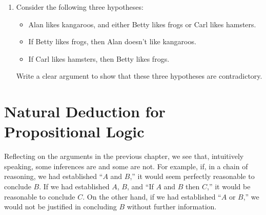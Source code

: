 \documentclass[letterpaper,10pt,english]{sphinxmanual}
\begin{document}
\begin{enumerate}
\sphinxAtStartPar
With these conventions, the first clue can be represented as
\begin{equation*}
\begin{split}((FA \vee SA) \to (MW \vee DW)) \wedge ((MA \vee DA) \to (FW \vee SW)),\end{split}
\end{equation*}
\sphinxAtStartPar
in other words, if the father or son was the accessory, then the mother or daughter was the witness, and vice\sphinxhyphen{}versa. Represent the other five clues in a similar manner.

\sphinxAtStartPar
Representing the fourth clue is tricky. Try to write down a formula that describes all the possibilities that are not ruled out by the information.

\item {} 
\sphinxAtStartPar
Consider the following three hypotheses:
\begin{itemize}
\item {} 
\sphinxAtStartPar
Alan likes kangaroos, and either Betty likes frogs or Carl likes hamsters.

\item {} 
\sphinxAtStartPar
If Betty likes frogs, then Alan doesn’t like kangaroos.

\item {} 
\sphinxAtStartPar
If Carl likes hamsters, then Betty likes frogs.

\end{itemize}

\sphinxAtStartPar
Write a clear argument to show that these three hypotheses are contradictory.

\end{enumerate}


\chapter{Natural Deduction for Propositional Logic}
\label{\detokenize{natural_deduction_for_propositional_logic:natural-deduction-for-propositional-logic}}\label{\detokenize{natural_deduction_for_propositional_logic::doc}}
\sphinxAtStartPar
Reflecting on the arguments in the previous chapter, we see that, intuitively speaking, some inferences are  and some are not. For example, if, in a chain of reasoning, we had established “\(A\) and \(B\),” it would seem perfectly reasonable to conclude \(B\). If we had established \(A\), \(B\), and “If \(A\) and \(B\) then \(C\),” it would be reasonable to conclude \(C\). On the other hand, if we had established “\(A\) or \(B\),” we would not be justified in concluding \(B\) without further information.
\end{document}
